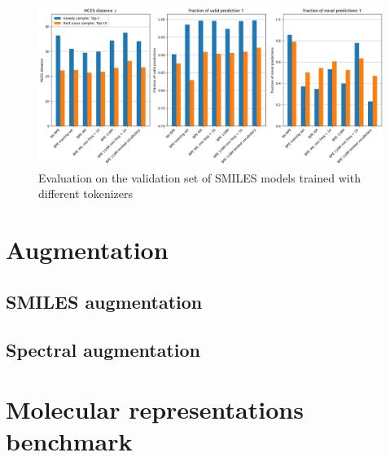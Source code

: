 \begin{figure}[h]
    \centering
    \includegraphics[width=1.0\textwidth]{figures/results/bpe.png}
    \caption{Evaluation on the validation set of SMILES models trained with different tokenizers}
    \label{fig:bpe}
\end{figure}

\section{Augmentation}

\subsection{SMILES augmentation}

\subsection{Spectral augmentation}


\section{Molecular representations benchmark}
